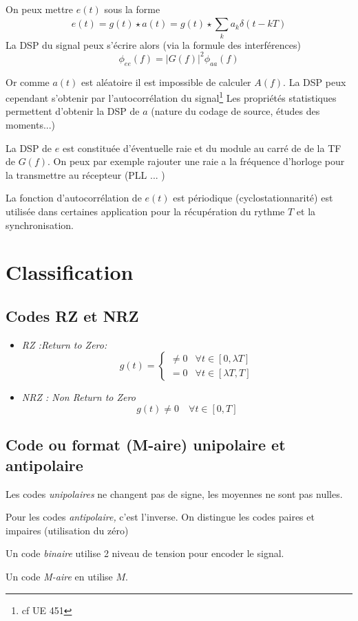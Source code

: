 \documentclass[main.tex]{subfiles}
\begin{document}
  On peux mettre $e(t)$ sous la forme
  \[
    e(t) = g(t) \star a(t) =g(t)\star \sum_{k}^{}a_k\delta(t-kT)
  \]
  La DSP du signal peux s'écrire alors  (via la formule des interférences)
  \[
    \phi_{ee}(f) = |G(f)|^2 \phi_{aa}(f)
  \]

  Or comme $a(t)$ est aléatoire il est impossible de calculer $A(f)$. La DSP peux cependant s'obtenir  par l'autocorrélation du signal\footnote{cf UE 451}  Les propriétés statistiques permettent d'obtenir la DSP de $a$ (nature du codage de source, études des moments...)

  \begin{rem}
    La DSP de $e$ est constituée d'éventuelle raie et du module au carré de de la TF de $G(f)$. On peux par exemple rajouter une raie a la fréquence d'horloge pour la transmettre au récepteur (PLL ... )

    La fonction d'autocorrélation de $e(t)$ est périodique (cyclostationnarité) est  utilisée dans certaines application pour la récupération du rythme $T$ et la synchronisation.
  \end{rem}
\section{Classification}
\subsection{Codes RZ et NRZ}
\begin{defin}
  \begin{itemize}
  \item\emph{ RZ :Return to Zero:}
    \[
      g(t) =
      \begin{cases}
        \neq 0 & \forall  t \in [0,\lambda T]\\
        = 0 & \forall t \in [\lambda T ,T]
      \end{cases}
    \]
  \item\emph{ NRZ : Non Return to Zero}
    \[
      g(t) \neq 0 \quad \forall t\in[0,T]
    \]
  \end{itemize}
\end{defin}
\subsection{Code ou format (M-aire) unipolaire et antipolaire}
\begin{defin}
  Les codes \emph{unipolaires} ne changent pas de signe, les moyennes ne sont pas nulles.

  Pour les codes\emph{ antipolaire,} c'est l'inverse.
  On distingue les codes paires et impaires (utilisation du zéro)

\end{defin}
\begin{defin}
  Un code \emph{binaire} utilise 2 niveau de tension pour encoder le
  signal.

  Un code \emph{M-aire} en utilise $M$.
\end{defin}
\end{document}
